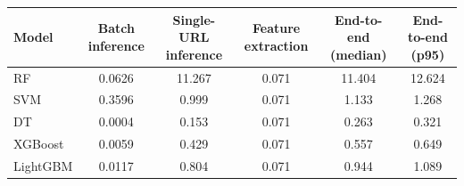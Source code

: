 \begin{tabular}{@{}lccccc@{}}
\toprule
\textbf{Model} & \textbf{Batch inference} & \textbf{Single-URL inference} & \textbf{Feature extraction} & \textbf{End-to-end (median)} & \textbf{End-to-end (p95)}\\
\midrule
RF & 0.0626 & 11.267 & 0.071 & 11.404 & 12.624\\
SVM & 0.3596 & 0.999 & 0.071 & 1.133 & 1.268\\
DT & 0.0004 & 0.153 & 0.071 & 0.263 & 0.321\\
XGBoost & 0.0059 & 0.429 & 0.071 & 0.557 & 0.649\\
LightGBM & 0.0117 & 0.804 & 0.071 & 0.944 & 1.089\\
\bottomrule
\end{tabular}